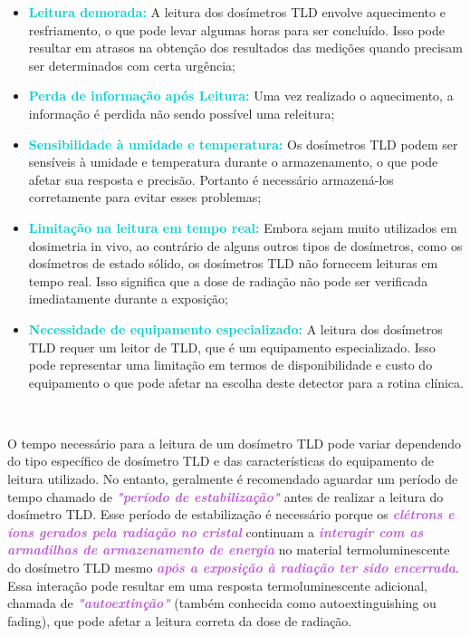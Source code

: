 \documentclass[11pt,a4paper]{article}
\begin{document}
\begin{tcolorbox}
		\begin{itemize}[label=\textcolor{CarnationPink}{$\blacktriangleright$}]
			\item \textcolor{DarkTurquoise}{\textbf{Leitura demorada:}} A leitura dos dosímetros TLD envolve aquecimento e resfriamento, o que pode levar algumas horas para ser concluído. Isso pode resultar em atrasos na obtenção dos resultados das medições quando precisam ser determinados com certa urgência;
			\item \textcolor{DarkTurquoise}{\textbf{Perda de informação após Leitura:}} Uma vez realizado o aquecimento, a informação é perdida não sendo possível uma releitura;
			\item \textcolor{DarkTurquoise}{\textbf{Sensibilidade à umidade e temperatura:}} Os dosímetros TLD podem ser sensíveis à umidade e temperatura durante o armazenamento, o que pode afetar sua resposta e precisão. Portanto é necessário armazená-los corretamente para evitar esses problemas;
			\item \textcolor{DarkTurquoise}{\textbf{Limitação na leitura em tempo real:}} Embora sejam muito utilizados em dosimetria in vivo, ao contrário de alguns outros tipos de dosímetros, como os dosímetros de estado sólido, os dosímetros TLD não fornecem leituras em tempo real. Isso significa que a dose de radiação não pode ser verificada imediatamente durante a exposição;
			\item \textcolor{DarkTurquoise}{\textbf{Necessidade de equipamento especializado:}} A leitura dos dosímetros TLD requer um leitor de TLD, que é um equipamento especializado. Isso pode representar uma limitação em termos de disponibilidade e custo do equipamento o que pode afetar na escolha deste detector para a rotina clínica.
		\end{itemize}

		\end{tcolorbox}
		
		\

		O tempo necessário para a leitura de um dosímetro TLD pode variar dependendo do tipo específico de dosímetro TLD e das características do equipamento de leitura utilizado. No entanto, geralmente é recomendado aguardar um período de tempo chamado de \textcolor{MediumOrchid}{\textit{\textbf{"período de estabilização"}}} antes de realizar a leitura do dosímetro TLD. Esse período de estabilização é necessário porque os \textcolor{MediumOrchid}{\textit{\textbf{elétrons e íons gerados pela radiação no cristal}}} continuam a \textcolor{MediumOrchid}{\textit{\textbf{interagir com as armadilhas de armazenamento de energia}}} no material termoluminescente do dosímetro TLD mesmo \textcolor{MediumOrchid}{\textit{\textbf{após a exposição à radiação ter sido encerrada}}}. Essa interação pode resultar em uma resposta termoluminescente adicional, chamada de \textcolor{MediumOrchid}{\textit{\textbf{"autoextinção" }}}(também conhecida como autoextinguishing ou fading), que pode afetar a leitura correta da dose de radiação. 
\end{document}
